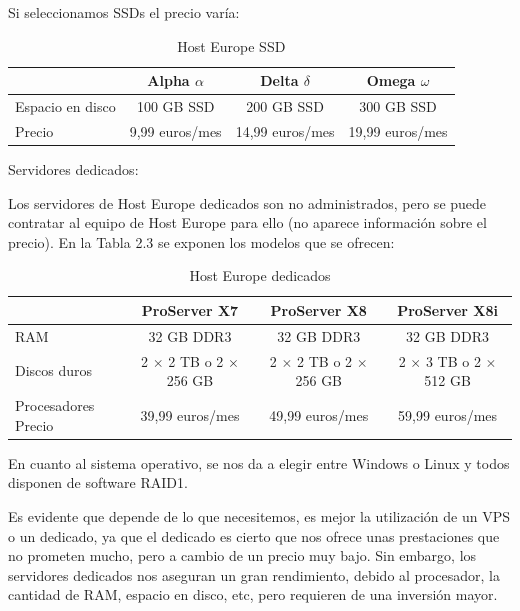 Si seleccionamos SSDs el precio varía:
 
\begin{table}[h]
\begin{tabular}{l | c | c | c }
 & Alpha $\alpha$ & Delta $\delta$ & Omega $\omega$ \\
 \hline
 Espacio en disco & 100 GB SSD & 200 GB SSD & 300 GB SSD \\
 Precio & 9,99 euros/mes & 14,99 euros/mes &  19,99 euros/mes \\
 \end{tabular}
 \caption{Host Europe SSD}
 \label{hevpsssd}
 \end{table}
 
Servidores dedicados:

Los servidores de Host Europe dedicados son no administrados, pero se puede contratar al equipo de Host Europe para ello (no aparece información sobre el precio). En la Tabla 2.3 se exponen los modelos que se ofrecen:

\begin{table}[h]
\begin{tabular}{l | c | c | c}
 & ProServer X7 & ProServer X8 & ProServer X8i \\
\hline
RAM & 32 GB DDR3 & 32 GB DDR3 & 32 GB DDR3 \\
Discos duros & 2 $\times$ 2 TB o 2 $\times$ 256 GB & 2 $\times$ 2 TB o 2 $\times$ 256 GB & 2 $\times$ 3 TB o 2 $\times$ 512 GB \\
Procesadores
Precio & 39,99 euros/mes & 49,99 euros/mes & 59,99 euros/mes \\
\end{tabular}
\caption{Host Europe dedicados}
\label{heselin}
\end{table}

En cuanto al sistema operativo, se nos da a elegir entre Windows o Linux y todos disponen de software RAID1.

Es evidente que depende de lo que necesitemos, es mejor la utilización de un VPS o un dedicado, ya que el dedicado es cierto que nos ofrece unas prestaciones que no prometen mucho, pero a cambio de un precio muy bajo. Sin embargo, los servidores dedicados nos aseguran un gran rendimiento, debido al procesador, la cantidad de RAM, espacio en disco, etc, pero requieren de una inversión mayor.



